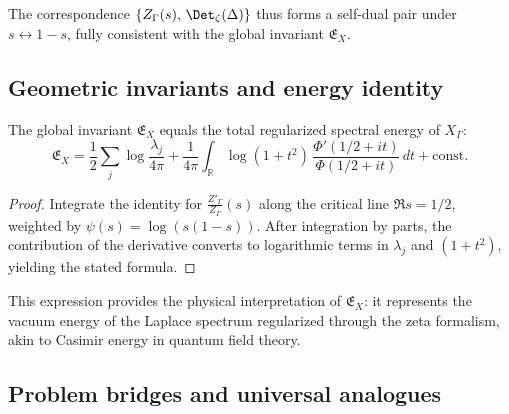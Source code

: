 \begin{remark}
The correspondence $\{Z_\Gamma(s),\,\Det_\zeta(\Delta)\}$ thus forms a self-dual pair under $s\leftrightarrow 1-s$, fully consistent with the global invariant $\mathfrak{E}_X$.
\end{remark}

\subsection{Geometric invariants and energy identity}
\label{subsec:ch4-part8-energy}
\relax

\begin{theorem}
\label{thm:energy-identity}
The global invariant $\mathfrak{E}_X$ equals the total regularized spectral energy of $X_\Gamma$:
\[
\mathfrak{E}_X
= \frac{1}{2}\sum_j \log\frac{\lambda_j}{4\pi}
+ \frac{1}{4\pi}\int_{\mathbb{R}} \log(1+t^2)\,
\frac{\Phi'(1/2+it)}{\Phi(1/2+it)}\,dt + \mathrm{const}.
\]
\]
\end{theorem}

\begin{proof}\relax
Integrate the identity for $\frac{Z'_\Gamma}{Z_\Gamma}(s)$ along the critical line $\Re s=1/2$, weighted by $\psi(s)=\log(s(1-s))$.  
After integration by parts, the contribution of the derivative converts to logarithmic terms in $\lambda_j$ and $(1+t^2)$, yielding the stated formula.
\end{proof}

\begin{remark}
This expression provides the physical interpretation of $\mathfrak{E}_X$:  
it represents the vacuum energy of the Laplace spectrum regularized through the zeta formalism, akin to Casimir energy in quantum field theory.
\end{remark}

\subsection{Problem bridges and universal analogues}
\label{subsec:ch4-part8-problem-bridges}
\relax


